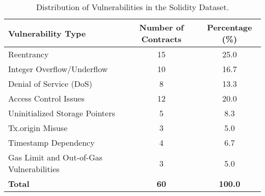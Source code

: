 
\begin{table}[ht]
\centering
\caption{Distribution of Vulnerabilities in the Solidity Dataset.}
\label{tab:solidity-distribution}
\begin{tabularx}{\columnwidth}{|>{\raggedright\arraybackslash}X|S[table-format=2.0]|S[table-format=2.1]|}
\hline
\textbf{Vulnerability Type} & {\textbf{Number of Contracts}} & {\textbf{Percentage (\%)}} \\ \hline
Reentrancy & 15 & 25.0 \\ \hline
Integer Overflow/Underflow & 10 & 16.7 \\ \hline
Denial of Service (DoS) & 8 & 13.3 \\ \hline
Access Control Issues & 12 & 20.0 \\ \hline
Uninitialized Storage Pointers & 5 & 8.3 \\ \hline
Tx.origin Misuse & 3 & 5.0 \\ \hline
Timestamp Dependency & 4 & 6.7 \\ \hline
Gas Limit and Out-of-Gas Vulnerabilities & 3 & 5.0 \\ \hline
\textbf{Total} & \textbf{60} & \textbf{100.0} \\ \hline
\end{tabularx}
\end{table}


